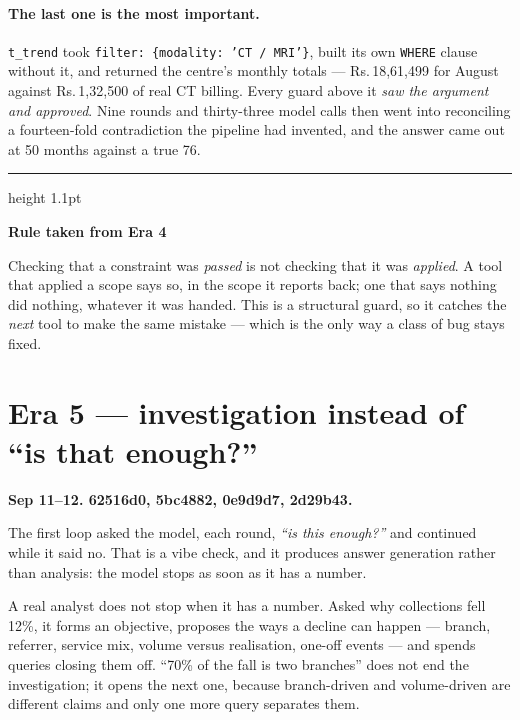 \documentclass[11pt,a4paper]{report}
\newcommand{\rs}[1]{Rs.\,#1}
\newcommand{\code}[1]{\texttt{\small #1}}
\newcommand{\sha}[1]{{\ttfamily\small\color{slate}#1}}
\newenvironment{keybox}[1]
 {\par\medskip\begin{center}\begin{minipage}{0.94\textwidth}%
  {\color{navy}\hrule height 1.1pt}\vspace{5pt}\par
  \textbf{\color{navy}#1}\par\vspace{3pt}\small}
 {\par\vspace{5pt}{\color{mist}\hrule height 0.8pt}\end{minipage}\end{center}\medskip}
\begin{document}
\paragraph{The last one is the most important.} \code{t\_trend} took
\code{filter: \{modality: 'CT / MRI'\}}, built its own \code{WHERE} clause without it, and returned
the centre's monthly totals --- \rs{18{,}61{,}499} for August against \rs{1{,}32{,}500} of real CT
billing. Every guard above it \emph{saw the argument and approved}. Nine rounds and thirty-three
model calls then went into reconciling a fourteen-fold contradiction the pipeline had invented, and
the answer came out at 50 months against a true 76.

\begin{keybox}{Rule taken from Era 4}
Checking that a constraint was \emph{passed} is not checking that it was \emph{applied}. A tool
that applied a scope says so, in the scope it reports back; one that says nothing did nothing,
whatever it was handed. This is a structural guard, so it catches the \emph{next} tool to make the
same mistake --- which is the only way a class of bug stays fixed.
\end{keybox}

\section{Era 5 --- investigation instead of ``is that enough?''}
\label{sec:era5}

\textbf{Sep 11--12. \sha{62516d0}, \sha{5bc4882}, \sha{0e9d9d7}, \sha{2d29b43}.}

The first loop asked the model, each round, \emph{``is this enough?''} and continued while it said
no. That is a vibe check, and it produces answer generation rather than analysis: the model stops
as soon as it has a number.

A real analyst does not stop when it has a number. Asked why collections fell 12\%, it forms an
objective, proposes the ways a decline can happen --- branch, referrer, service mix, volume versus
realisation, one-off events --- and spends queries closing them off. ``70\% of the fall is two
branches'' does not end the investigation; it opens the next one, because branch-driven and
volume-driven are different claims and only one more query separates them.
\end{document}
